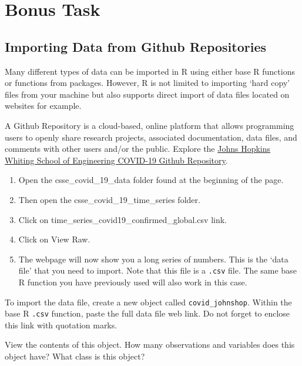 \documentclass[
]{book}
\providecommand{\tightlist}{%
  \setlength{\itemsep}{0pt}\setlength{\parskip}{0pt}}
\begin{document}
\hypertarget{bonus-task}{%
\section{Bonus Task}\label{bonus-task}}

\hypertarget{importing-data-from-github-repositories}{%
\subsection{Importing Data from Github Repositories}\label{importing-data-from-github-repositories}}

Many different types of data can be imported in R using either base R functions or functions from packages. However, R is not limited to importing `hard copy' files from your machine but also supports direct import of data files located on websites for example.

A Github Repository is a cloud-based, online platform that allows programming users to openly share research projects, associated documentation, data files, and comments with other users and/or the public.
Explore the \href{(https://github.com/CSSEGISandData/COVID-19)}{Johns Hopkins Whiting School of Engineering COVID-19 Github Repository}.

\begin{enumerate}
\def\labelenumi{\arabic{enumi}.}
\tightlist
\item
  Open the csse\_covid\_19\_data folder found at the beginning of the page.
\item
  Then open the csse\_covid\_19\_time\_series folder.
\item
  Click on time\_series\_covid19\_confirmed\_global.csv link.
\item
  Click on View Raw.
\item
  The webpage will now show you a long series of numbers. This is the `data file' that you need to import. Note that this file is a \texttt{.csv} file. The same base R function you have previously used will also work in this case.
\end{enumerate}

To import the data file, create a new object called \texttt{covid\_johnshop}. Within the base R \texttt{.csv} function, paste the full data file web link. Do not forget to enclose this link with quotation marks.

View the contents of this object. How many observations and variables does this object have? What class is this object?
\end{document}
